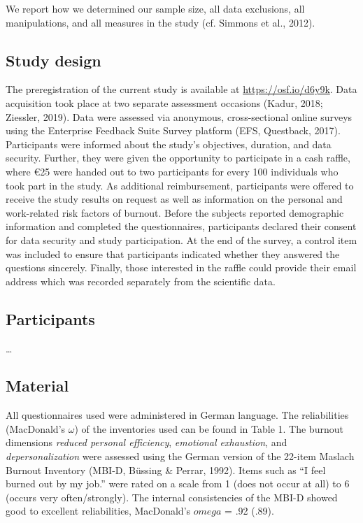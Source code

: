 \documentclass[
  man]{apa6}
\begin{document}
We report how we determined our sample size, all data exclusions, all manipulations, and all measures in the study (cf. Simmons et al., 2012).

\subsection{Study design}\label{study-design}

The preregistration of the current study is available at \url{https://osf.io/d6y9k}.
Data acquisition took place at two separate assessment occasions (Kadur, 2018; Ziessler, 2019).
Data were assessed via anonymous, cross-sectional online surveys using the Enterprise Feedback Suite Survey platform (EFS, Questback, 2017).
Participants were informed about the study's objectives, duration, and data security.
Further, they were given the opportunity to participate in a cash raffle, where €25 were handed out to two participants for every 100 individuals who took part in the study.
As additional reimbursement, participants were offered to receive the study results on request as well as information on the personal and work-related risk factors of burnout.
Before the subjects reported demographic information and completed the questionnaires, participants declared their consent for data security and study participation.
At the end of the survey, a control item was included to ensure that participants indicated whether they answered the questions sincerely.
Finally, those interested in the raffle could provide their email address which was recorded separately from the scientific data.

\subsection{Participants}\label{participants}

\ldots{}

\subsection{Material}\label{material}

All questionnaires used were administered in German language.
The reliabilities (MacDonald's \(\omega\)) of the inventories used can be found in Table 1.
The burnout dimensions \emph{reduced personal efficiency}, \emph{emotional exhaustion}, and \emph{depersonalization} were assessed using the German version of the 22-item Maslach Burnout Inventory (MBI-D, Büssing \& Perrar, 1992).
Items such as ``I feel burned out by my job.'' were rated on a scale from 1 (does not occur at all) to 6 (occurs very often/strongly).
The internal consistencies of the MBI-D showed good to excellent reliabilities, MacDonald's \(omega\) = .92 (.89).
\end{document}
